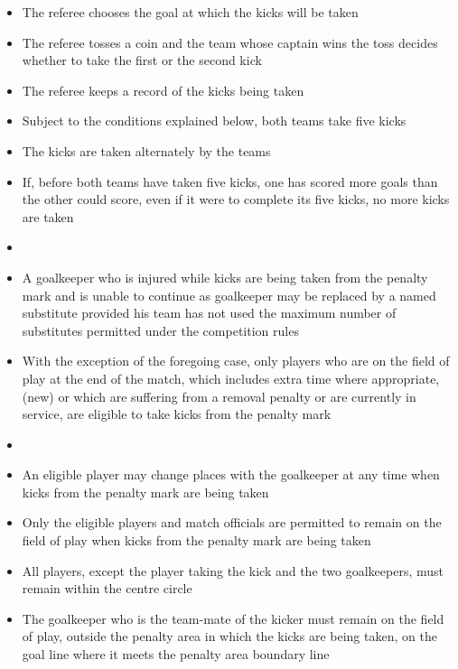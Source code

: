 \begin{itemize}
\item The referee chooses the goal at which the kicks will be taken
\item The referee tosses a coin and the team whose captain wins the toss decides whether to take the first or the second kick
\item The referee keeps a record of the kicks being taken 
\item Subject to the conditions explained below, both teams take five kicks 
\item The kicks are taken alternately by the teams 
\item If, before both teams have taken five kicks, one has scored more goals than the other could score, even if it were to complete its five kicks, no more kicks are taken
\item {}
\item A goalkeeper who is injured while kicks are being taken from the penalty mark and is unable to continue as goalkeeper may be replaced by a named substitute provided his team has not used the maximum number of substitutes permitted under the competition rules
\item With the exception of the foregoing case, only players who are on the field of play at the end of the match, which includes extra time where appropriate, (new) or which are suffering from a removal penalty or are currently in service, are eligible to take kicks from the penalty mark
\item {}
\item An eligible player may change places with the goalkeeper at any time when kicks from the penalty mark are being taken
\item Only the eligible players and match officials are permitted to remain on the field of play when kicks from the penalty mark are being taken
\item All players, except the player taking the kick and the two goalkeepers, must remain within the centre circle
\item The goalkeeper who is the team-mate of the kicker must remain on the field of play, outside the penalty area in which the kicks are being taken, on the goal line where it meets the penalty area boundary line

\end{itemize}
